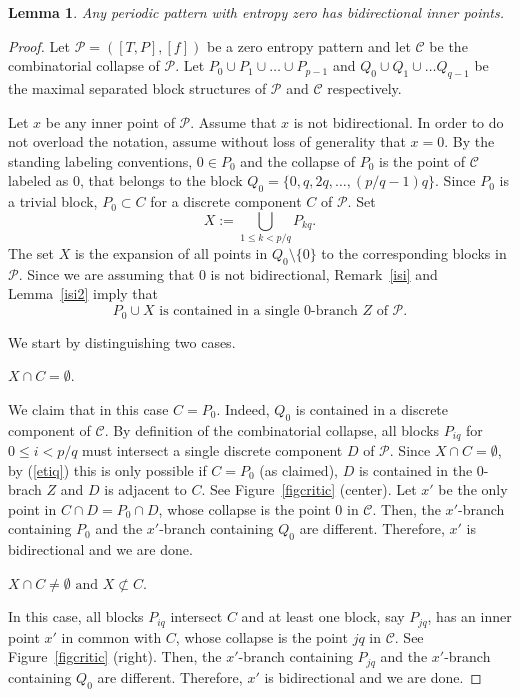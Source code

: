 \documentclass[a4paper]{amsart}
\newtheorem{lemma}[theorem]{Lemma}
\theoremstyle{definition}
\newenvironment{case}[2][Case]{%
  \trivlist \item[\hskip\labelsep{\itshape #1 #2.}]\begin{em}}{
  \end{em}\endtrivlist}
\begin{document}
\begin{lemma}\label{critic}
Any periodic pattern with entropy zero has bidirectional inner points.
\end{lemma}
\begin{proof}
Let $\mathcal{P}=([T,P],[f])$ be a zero entropy pattern and let $\mathcal{C}$ be the combinatorial collapse of $\mathcal{P}$. Let
$P_0\cup P_1\cup\ldots\cup P_{p-1}$ and $Q_0\cup Q_1\cup\ldots Q_{q-1}$ be the maximal separated block structures of $\mathcal{P}$ and $\mathcal{C}$ respectively.

Let $x$ be any inner point of $\mathcal{P}$. Assume that $x$ is not bidirectional. In order to do not overload the notation, assume without loss of generality that $x=0$. By the standing labeling conventions, $0\in P_0$ and the collapse of $P_0$ is the point of $\mathcal{C}$ labeled as 0, that belongs to the block $Q_0=\{0,q,2q,\ldots,(p/q-1)q\}$. Since $P_0$ is a trivial block, $P_0\subset C$ for a discrete component $C$ of $\mathcal{P}$. Set
\[ X:=\bigcup_{1\le k<p/q} P_{kq}. \]
The set $X$ is the expansion of all points in $Q_0\setminus\{0\}$ to the corresponding blocks in $\mathcal{P}$. Since we are assuming that 0 is not bidirectional, Remark~\ref{isi} and Lemma~\ref{isi2} imply that
\begin{equation}\label{etiq}
P_0\cup X\mbox{ is contained in a single 0-branch $Z$ of }\mathcal{P}.
\end{equation}

We start by distinguishing two cases.

\begin{case}{1} $X\cap C=\emptyset$. \end{case}
We claim that in this case $C=P_0$. Indeed, $Q_0$ is contained in a discrete component of $\mathcal{C}$. By definition of the combinatorial collapse, all blocks $P_{iq}$ for $0\le i<p/q$ must intersect a single discrete component $D$ of $\mathcal{P}$. Since $X\cap C=\emptyset$, by (\ref{etiq}) this is only possible if $C=P_0$ (as claimed), $D$ is contained in the 0-brach $Z$ and $D$ is adjacent to $C$. See Figure~\ref{figcritic} (center). Let $x'$ be the only point in $C\cap D=P_0\cap D$, whose collapse is the point 0 in $\mathcal{C}$. Then, the $x'$-branch containing $P_0$ and the $x'$-branch containing $Q_0$ are different. Therefore, $x'$ is bidirectional and we are done.

\begin{case}{2} $X\cap C\ne\emptyset\mbox{ and }X\not\subset C$. \end{case}
In this case, all blocks $P_{iq}$ intersect $C$ and at least one block, say $P_{jq}$, has an inner point $x'$ in common with $C$, whose collapse is the point $jq$ in $\mathcal{C}$. See Figure~\ref{figcritic} (right). Then, the $x'$-branch containing $P_{jq}$ and the $x'$-branch containing $Q_0$ are different. Therefore, $x'$ is bidirectional and we are done.


\end{proof}
\end{document}
